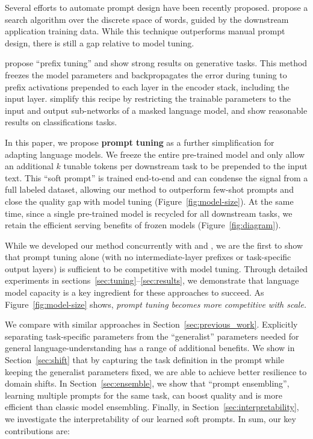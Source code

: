 \documentclass[11pt]{article}
\begin{document}
Several efforts to automate prompt design have been recently proposed.
\citet{shin-etal-2020-autoprompt} propose a search algorithm over the discrete space of words, guided by the downstream application training data.
While this technique outperforms manual prompt design, there is still a gap relative to model tuning.

\citet{li_2021_prefix_tuning} propose ``prefix tuning'' and show strong results on generative tasks. This method freezes the model parameters and backpropagates the error during tuning to prefix activations prepended to each layer in the encoder stack, including the input layer.
\citet{hambardzumyan_2021_warp} simplify this recipe by restricting the trainable parameters to the input and output sub-networks of a masked language model, and show reasonable results on classifications tasks.

In this paper, we propose \textbf{prompt tuning} as a further simplification for adapting language models. We freeze the entire pre-trained model and only allow an additional $k$ tunable tokens per downstream task to be prepended to the input text. This ``soft prompt'' is trained end-to-end and can condense the signal from a full labeled dataset, allowing our method to outperform few-shot prompts and close the quality gap with model tuning (Figure~\ref{fig:model-size}). At the same time, since a single pre-trained model is recycled for all downstream tasks, we retain the efficient serving benefits of frozen models (Figure~\ref{fig:diagram}).

While we developed our method concurrently with \citet{li_2021_prefix_tuning} and \citet{hambardzumyan_2021_warp}, we are the first to show that prompt tuning alone (with no intermediate-layer prefixes or task-specific output layers) is sufficient to be competitive with model tuning.
Through detailed experiments in sections~\ref{sec:tuning}--\ref{sec:results}, we demonstrate that language model capacity is a key ingredient for these approaches to succeed. As Figure~\ref{fig:model-size} shows, \emph{prompt tuning becomes more competitive with scale.}

We compare with similar approaches in Section~\ref{sec:previous_work}. Explicitly separating task-specific parameters from the ``generalist'' parameters needed for general language-understanding has a range of additional benefits. We show in Section~\ref{sec:shift} that by capturing the task definition in the prompt while keeping the generalist parameters fixed, we are able to achieve better resilience to domain shifts. In Section~\ref{sec:ensemble}, we show that ``prompt ensembling'', learning multiple prompts for the same task, can boost quality and is more efficient than classic model ensembling. Finally, in Section~\ref{sec:interpretability}, we investigate the interpretability of our learned soft prompts. In sum, our key contributions are:
\end{document}
